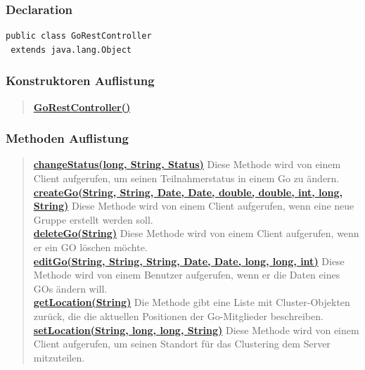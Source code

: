 \documentclass[11pt,a4paper]{article}
\begin{document}
{{{{{{{{{{{{{{{{{\subsubsection{Declaration}{
\begin{lstlisting}[frame=none]
public class GoRestController
 extends java.lang.Object\end{lstlisting}
\subsubsection{Konstruktoren Auflistung}{
\begin{verse}
\hyperlink{edu.kit.pse17.go_app.ClientCommunication.Upstream.GoRestController()}{{\bf GoRestController()}} \\
\end{verse}
}
\subsubsection{Methoden Auflistung}{
\begin{verse}
\hyperlink{edu.kit.pse17.go_app.ClientCommunication.Upstream.GoRestController.changeStatus(long, java.lang.String, edu.kit.pse17.go_app.PersistenceLayer.Status)}{{\bf changeStatus(long, String, Status)}} Diese Methode wird von einem Client aufgerufen, um seinen Teilnahmerstatus in einem Go zu ändern.\\
\hyperlink{edu.kit.pse17.go_app.ClientCommunication.Upstream.GoRestController.createGo(java.lang.String, java.lang.String, java.util.Date, java.util.Date, double, double, int, long, java.lang.String)}{{\bf createGo(String, String, Date, Date, double, double, int, long, String)}} Diese Methode wird von einem Client aufgerufen, wenn eine neue Gruppe erstellt werden soll.\\
\hyperlink{edu.kit.pse17.go_app.ClientCommunication.Upstream.GoRestController.deleteGo(java.lang.String)}{{\bf deleteGo(String)}} Diese Methode wird von einem Client aufgerufen, wenn er ein GO löschen möchte.\\
\hyperlink{edu.kit.pse17.go_app.ClientCommunication.Upstream.GoRestController.editGo(java.lang.String, java.lang.String, java.lang.String, java.util.Date, java.util.Date, long, long, int)}{{\bf editGo(String, String, String, Date, Date, long, long, int)}} Diese Methode wird von einem Benutzer aufgerufen, wenn er die Daten eines GOs ändern will.\\
\hyperlink{edu.kit.pse17.go_app.ClientCommunication.Upstream.GoRestController.getLocation(java.lang.String)}{{\bf getLocation(String)}} Die Methode gibt eine Liste mit Cluster-Objekten zurück, die die aktuellen Positionen der Go-Mitglieder beschreiben.\\
\hyperlink{edu.kit.pse17.go_app.ClientCommunication.Upstream.GoRestController.setLocation(java.lang.String, long, long, java.lang.String)}{{\bf setLocation(String, long, long, String)}} Diese Methode wird von einem Client aufgerufen, um seinen Standort für das Clustering dem Server mitzuteilen.\\
\end{verse}
}
}}}}}}}}}}}}}}}}}}
\end{document}
